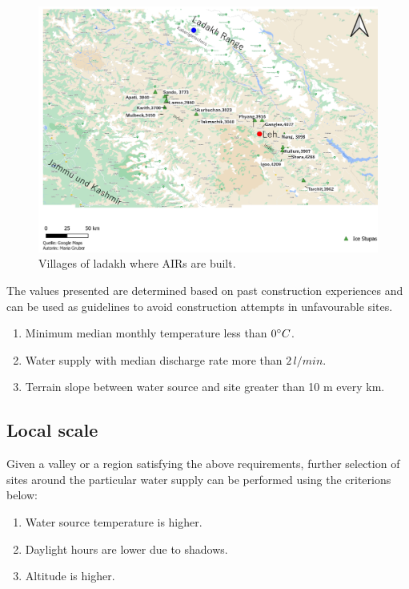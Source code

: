 \begin{figure}[htb]
	\includegraphics[width=\textwidth]{figs/ISC_villages}
  \caption{Villages of ladakh where AIRs are built.}
	\label{fig:air_villages}
\end{figure}

The values presented are determined based on past construction experiences and can be used as guidelines to
avoid construction attempts in unfavourable sites.

\begin{enumerate}

  \item Minimum median monthly temperature less than $0 ^{\circ} C$. 
  \item Water supply with median discharge rate more than $2\, l/min$.
  \item Terrain slope between water source and site greater than 10 m every km. 

\end{enumerate}

\subsection{Local scale}

Given a valley or a region satisfying the above requirements, further selection of sites around the particular
water supply can be performed using the criterions below: 

\begin{enumerate}
  \item Water source temperature is higher.
  \item Daylight hours are lower due to shadows.
  \item Altitude is higher.
\end{enumerate}

